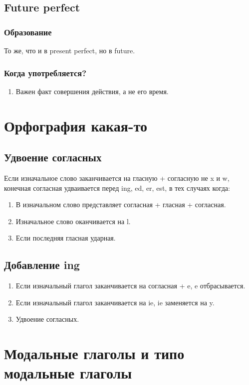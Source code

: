 \documentclass[oneside]{book}
\begin{document}
\section{Future perfect}
\subsection{Образование}
То же, что и в present perfect, но в future.

\subsection{Когда употребляется?}
\begin{enumerate}
    \item Важен факт совершения действия, а не его время.
\end{enumerate}

\chapter{Орфография какая-то}
\section{Удвоение согласных}
Если изначальное слово заканчивается на гласную + согласную не x и w, конечная
согласная удваивается перед ing, ed, er, est,
в тех случаях когда:
\begin{enumerate}
    \item В изначальном слово представляет согласная + гласная + согласная.
    \item Изначальное слово оканчивается на l.
    \item Если последняя гласная ударная.
\end{enumerate}

\section{Добавление ing}
\begin{enumerate}
    \item Если изначальный глагол заканчивается на согласная + e, e отбрасывается.
    \item Если изначальный глагол заканчивается на ie, ie заменяется на y.
    \item Удвоение согласных.
\end{enumerate}

\chapter{Модальные глаголы и типо модальные глаголы}
\end{document}

